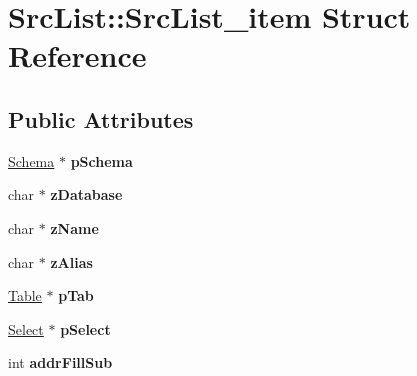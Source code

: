 \hypertarget{struct_src_list_1_1_src_list__item}{}\section{Src\+List\+:\+:Src\+List\+\_\+item Struct Reference}
\label{struct_src_list_1_1_src_list__item}
\subsection*{Public Attributes}
\begin{DoxyCompactItemize}
\item 
\mbox{\label{struct_src_list_1_1_src_list__item_a021ffb4d9282b6ce171bd57c4da97bf3}} 
\mbox{\hyperlink{struct_schema}{Schema}} $\ast$ {\bfseries p\+Schema}
\item 
\mbox{\label{struct_src_list_1_1_src_list__item_a2f7bf0921794dc46d74d2546fc10f7de}} 
char $\ast$ {\bfseries z\+Database}
\item 
\mbox{\label{struct_src_list_1_1_src_list__item_afee5c5a84594fed8100be3cdb3e3ff1c}} 
char $\ast$ {\bfseries z\+Name}
\item 
\mbox{\label{struct_src_list_1_1_src_list__item_a461ef8d80828ed8dd4409b9244ae2919}} 
char $\ast$ {\bfseries z\+Alias}
\item 
\mbox{\label{struct_src_list_1_1_src_list__item_a8779b2d10d0e25af78ad90e57f9cd4f6}} 
\mbox{\hyperlink{struct_table}{Table}} $\ast$ {\bfseries p\+Tab}
\item 
\mbox{\label{struct_src_list_1_1_src_list__item_ab44822fca7618c4f41f4f770ad41425b}} 
\mbox{\hyperlink{struct_select}{Select}} $\ast$ {\bfseries p\+Select}
\item 
\mbox{\label{struct_src_list_1_1_src_list__item_a1fb4f55d13641e11f07c3e535fd7cf1d}} 
int {\bfseries addr\+Fill\+Sub}
\item 
\mbox{\label{struct_src_list_1_1_src_list__item_a67344976677cbbdea271fcdf7be620cc}} 

\end{DoxyCompactItemize}
